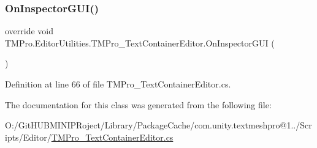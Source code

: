 \subsubsection{\texorpdfstring{OnInspectorGUI()}{OnInspectorGUI()}}
{\footnotesize\ttfamily override void T\+M\+Pro.\+Editor\+Utilities.\+T\+M\+Pro\+\_\+\+Text\+Container\+Editor.\+On\+Inspector\+G\+UI (\begin{DoxyParamCaption}{ }\end{DoxyParamCaption})}



Definition at line 66 of file T\+M\+Pro\+\_\+\+Text\+Container\+Editor.\+cs.



The documentation for this class was generated from the following file\+:\begin{DoxyCompactItemize}
\item 
O\+:/\+Git\+H\+U\+B\+M\+I\+N\+I\+P\+Roject/\+Library/\+Package\+Cache/com.\+unity.\+textmeshpro@1../\+Scripts/\+Editor/\mbox{\hyperlink{_t_m_pro___text_container_editor_8cs}{T\+M\+Pro\+\_\+\+Text\+Container\+Editor.\+cs}}\end{DoxyCompactItemize}
